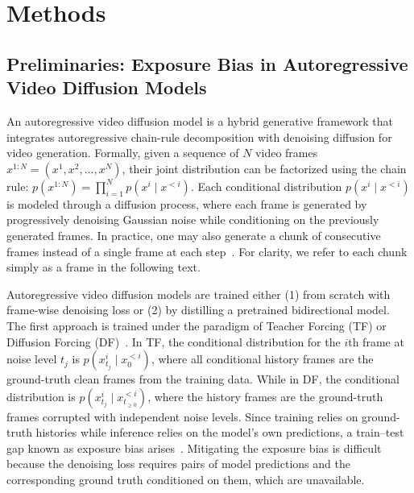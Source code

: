 




\section{Methods}

\subsection{Preliminaries: Exposure Bias in Autoregressive Video Diffusion Models}
An autoregressive video diffusion model is a hybrid generative framework that integrates autoregressive chain-rule decomposition with denoising diffusion for video generation.
Formally, given a sequence of $N$ video frames $x^{1:N} = (x^1, x^2, \dots, x^N)$, their joint distribution can be factorized using the chain rule: $p(x^{1:N}) = \prod_{i=1}^{N} p(x^i \mid x^{<i}).$ Each conditional distribution $p(x^i \mid x^{<i})$ is modeled through a diffusion process, where each frame is generated by progressively denoising Gaussian noise while conditioning on the previously generated frames. 
In practice, one may also generate a chunk of consecutive frames instead of a single frame at each step~\citep{yin2025slow, teng2025magi, huang2025self}. For clarity, we refer to each chunk simply as a frame in the following text.

Autoregressive video diffusion models are trained either (1) from scratch with frame-wise denoising loss or (2) by distilling a pretrained bidirectional model. The first approach is trained under the paradigm of Teacher Forcing (TF) or Diffusion Forcing (DF)~\citep{chen2024diffusion}. In TF, the conditional distribution for the $i$th frame at noise level $t_j$ is $p(x^i_{t_j} \mid x^{<i}_0)$, where all conditional history frames are the ground-truth clean frames from the training data. While in DF, the conditional distribution is $p(x^i_{t_j} \mid x^{<i}_{t_{\ge0}})$, where the history frames are the ground-truth frames corrupted with independent noise levels. Since training relies on ground-truth histories while inference relies on the model’s own predictions, a train–test gap known as exposure bias arises~\citep{schmidt2019generalization}. Mitigating the exposure bias is difficult because the denoising loss requires pairs of model predictions and the corresponding ground truth conditioned on them, which are unavailable. 

